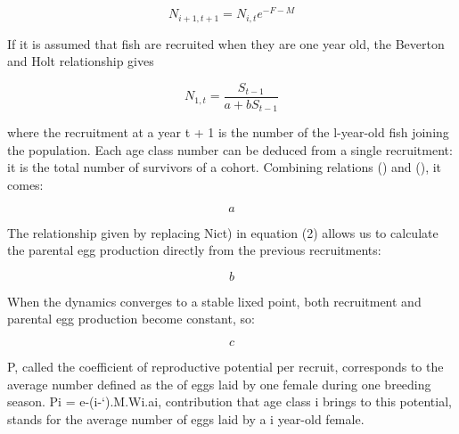 \documentclass[%
nonumbib,      %
%
]{nrc1}                          %
\begin{document}
\begin{equation}
N_{i+1,t+1}=N_{i,t}e^{-F-M}
\end{equation}

If it is assumed that fish are recruited when they are one year old, the Beverton and Holt relationship gives  

\begin{equation}
N_{1,t}=\frac{S_{t-1}}{a+bS_{t-1}} 
\end{equation}

where the recruitment at a year t + 1 is the number of the l-year-old fish joining the population. Each age class number can be deduced from a single recruitment:
it is the total number of survivors of a cohort. Combining relations () and (), it comes:

\begin{equation}
a
\end{equation}

The relationship given by replacing Nict) in equation (2) allows us to calculate the parental egg production directly from the previous recruitments:

\begin{equation}
b
\end{equation}

When the dynamics converges to a stable lixed point, both recruitment and parental egg production become constant, so:

\begin{equation}
c
\end{equation}

P, called the coefficient of reproductive potential per recruit, corresponds to the average number defined as the of eggs laid by one female during one breeding season. Pi = e-(i-‘).M.Wi.ai, contribution that age class i brings to this potential, stands for the average number of eggs laid
by a i year-old female.
\end{document}
